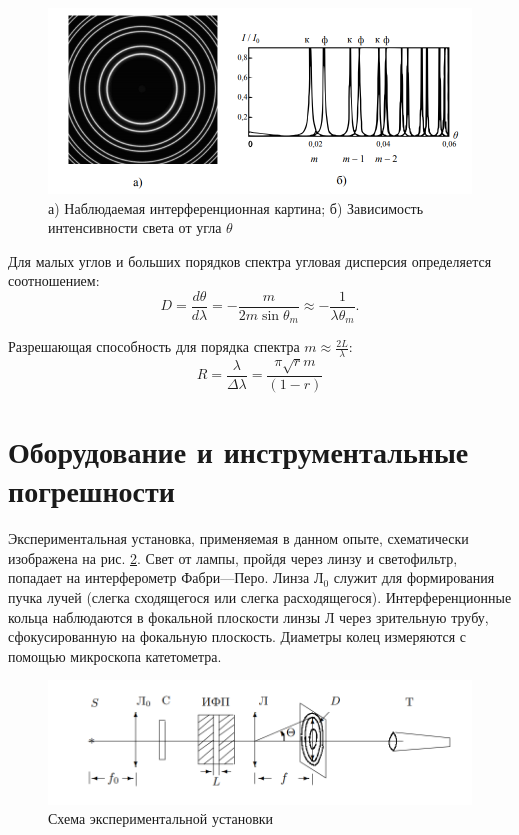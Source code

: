 \documentclass[a4paper]{article}
\begin{document}
\begin{figure}[]
	\centering
	\includegraphics[width=0.8\linewidth]{Screenshot_2}
	\caption{а) Наблюдаемая интерференционная картина; б) Зависимость интенсивности света от угла $ \theta $}
	\label{fig:screenshot2}
\end{figure}

Для малых углов и больших порядков спектра угловая дисперсия определяется соотношением:
\begin{equation*}\label{key}
	D = \frac{d \theta}{d \lambda} = - \frac{m}{2 m \sin \theta_m} \approx - \frac{1}{\lambda \theta_m}.
\end{equation*}

Разрешающая способность для порядка спектра $ m \approx \frac{2 L}{\lambda} $:
\begin{equation*}\label{key}
	R = \frac{\lambda}{\Delta \lambda}= \frac{\pi\sqrt{r} m }{(1-r)}
\end{equation*}

\section{Оборудование и инструментальные погрешности}

Экспериментальная установка, применяемая в данном опыте, схематически изображена на рис. \ref{fig:scheme}. Свет от лампы, пройдя через линзу и светофильтр, попадает на интерферометр Фабри—Перо. Линза $ Л_0 $ служит для формирования пучка лучей (слегка сходящегося или слегка расходящегося). Интерференционные кольца наблюдаются в фокальной плоскости линзы Л через зрительную трубу, сфокусированную на фокальную плоскость. Диаметры колец измеряются с помощью микроскопа катетометра.

\begin{figure}[]
	\centering
	\includegraphics[width=0.8\linewidth]{Screenshot_3}
	\caption{Схема экспериментальной установки}
	\label{fig:scheme}
\end{figure}
\end{document}
